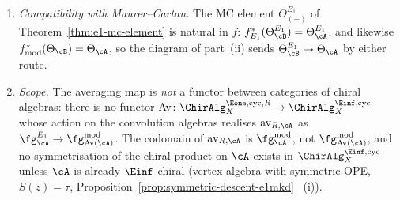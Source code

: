 \begin{theorem}
\begin{enumerate}[label=\textup{(\roman*)}]
\[\]
commutes on the nose at chain level for every
$f\colon \cA \to \cB$ in $\ChirAlg^{\Eone,\mathrm{cyc},R}_X$.
\item \emph{Compatibility with Maurer--Cartan.} The MC element
$\Theta^{E_1}_{(-)}$ of Theorem~\textup{\ref{thm:e1-mc-element}}
is natural in $f$:
$f^*_{E_1}(\Theta^{E_1}_\cB) = \Theta^{E_1}_\cA$, and likewise
$f^*_{\mathrm{mod}}(\Theta_\cB) = \Theta_\cA$, so the diagram of
part~\textup{(ii)} sends $\Theta^{E_1}_\cB \mapsto \Theta_\cA$ by
either route.
\item \emph{Scope.} The averaging map is
\emph{not} a functor between categories of chiral algebras:
there is no functor $\mathrm{Av}\colon \ChirAlg^{\Eone,\mathrm{cyc},R}_X
\to \ChirAlg^{\Einf,\mathrm{cyc}}_X$ whose action on
the convolution algebras realises $\operatorname{av}_{R,\cA}$ as
$\fg^{E_1}_\cA \to \fg^{\mathrm{mod}}_{\mathrm{Av}(\cA)}$. The
codomain of $\operatorname{av}_{R,\cA}$ is $\fg^{\mathrm{mod}}_\cA$,
not $\fg^{\mathrm{mod}}_{\mathrm{Av}(\cA)}$, and no symmetrisation
of the chiral product on $\cA$ exists in
$\ChirAlg^{\Einf,\mathrm{cyc}}_X$ unless $\cA$ is already
$\Einf$-chiral \textup{(}vertex algebra with symmetric OPE,
$S(z) = \tau$, Proposition~\textup{\ref{prop:symmetric-descent-e1mkd}}~%
\textup{(i)}\textup{)}.
\end{enumerate}
\end{theorem}

